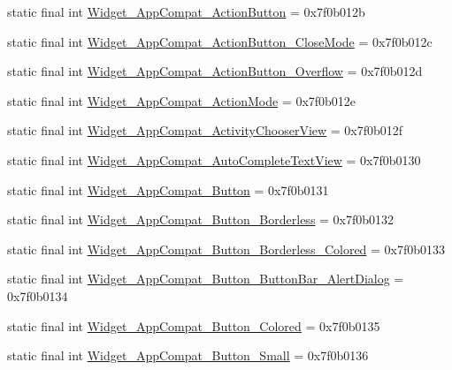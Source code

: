\begin{CompactItemize}
\item 
static final int \hyperlink{classandroid_1_1support_1_1v7_1_1palette_1_1_r_1_1style_96804e287247ac0b432d45181e65b8c9}{Widget\_\-AppCompat\_\-ActionButton} = 0x7f0b012b
\item 
static final int \hyperlink{classandroid_1_1support_1_1v7_1_1palette_1_1_r_1_1style_d3fc453908ca4ff07954729ed7af762d}{Widget\_\-AppCompat\_\-ActionButton\_\-CloseMode} = 0x7f0b012c
\item 
static final int \hyperlink{classandroid_1_1support_1_1v7_1_1palette_1_1_r_1_1style_e12ffbcc4b4d132a63eb6a67b84657c2}{Widget\_\-AppCompat\_\-ActionButton\_\-Overflow} = 0x7f0b012d
\item 
static final int \hyperlink{classandroid_1_1support_1_1v7_1_1palette_1_1_r_1_1style_119fcac210a9d44f51619ca2b89bf9c5}{Widget\_\-AppCompat\_\-ActionMode} = 0x7f0b012e
\item 
static final int \hyperlink{classandroid_1_1support_1_1v7_1_1palette_1_1_r_1_1style_5a3664eb59a224b297903f5de016de80}{Widget\_\-AppCompat\_\-ActivityChooserView} = 0x7f0b012f
\item 
static final int \hyperlink{classandroid_1_1support_1_1v7_1_1palette_1_1_r_1_1style_0fd089c7b13669eb607bf9cd7104e7a8}{Widget\_\-AppCompat\_\-AutoCompleteTextView} = 0x7f0b0130
\item 
static final int \hyperlink{classandroid_1_1support_1_1v7_1_1palette_1_1_r_1_1style_28aa13306a35e0207356e04089071f7b}{Widget\_\-AppCompat\_\-Button} = 0x7f0b0131
\item 
static final int \hyperlink{classandroid_1_1support_1_1v7_1_1palette_1_1_r_1_1style_0531cc79c84f2798e53a39b8bb6be10f}{Widget\_\-AppCompat\_\-Button\_\-Borderless} = 0x7f0b0132
\item 
static final int \hyperlink{classandroid_1_1support_1_1v7_1_1palette_1_1_r_1_1style_2ca9e19a68a31bb2873a1cf4f9b780df}{Widget\_\-AppCompat\_\-Button\_\-Borderless\_\-Colored} = 0x7f0b0133
\item 
static final int \hyperlink{classandroid_1_1support_1_1v7_1_1palette_1_1_r_1_1style_87376f37dc270f3bb4b24c8772aa39a1}{Widget\_\-AppCompat\_\-Button\_\-ButtonBar\_\-AlertDialog} = 0x7f0b0134
\item 
static final int \hyperlink{classandroid_1_1support_1_1v7_1_1palette_1_1_r_1_1style_b3eaf70dff3cf7d1c0d0307240082fa5}{Widget\_\-AppCompat\_\-Button\_\-Colored} = 0x7f0b0135
\item 
static final int \hyperlink{classandroid_1_1support_1_1v7_1_1palette_1_1_r_1_1style_2d9555a5bdbf3cd24735bb49fc8663c2}{Widget\_\-AppCompat\_\-Button\_\-Small} = 0x7f0b0136

\end{CompactItemize}
